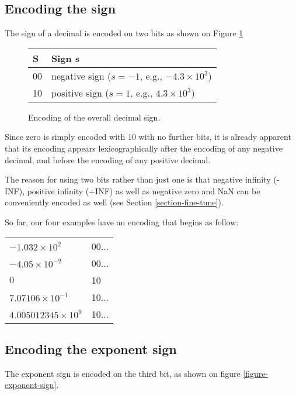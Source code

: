 \documentclass{acm_proc_article-sp}
\begin{document}
\subsection{Encoding the sign}

The sign of a decimal is encoded on two bits as shown on Figure \ref{figure-sign}

\begin{figure}[p]
\caption{Encoding of the overall decimal sign.}
\label{figure-sign}
\center
\begin{tabular}{|l|l|}
\hline
S & Sign s \\
\hline
00 &  negative sign ($s=-1$, e.g., $-4.3\times10^3$)\\
\hline
10 & positive sign ($s=1$, e.g., $4.3\times10^3$)\\
\hline
\end{tabular}
\end{figure}

Since zero is simply encoded with $10$ with no further bits, it is already apparent that its encoding appears lexicographically after the encoding of any negative decimal, and before the encoding of any positive decimal.

The reason for using two bits rather than just one is that negative infinity (-INF), positive infinity (+INF) as well as negative zero and NaN can be conveniently encoded as well (see Section \ref{section-fine-tune}).

So far, our four examples have an encoding that begins as follow:

\begin{tabular}{l|l}
$- 1.032 \times 10^2$ & 00... \\

$-4.05 \times 10^{-2}$ & 00... \\

$0$ & 10 \\

$7.07106 \times 10^{-1}$ & 10... \\

$4.005012345 \times 10^9$ & 10...\\
\end{tabular}
\subsection{Encoding the exponent sign}

The exponent sign is encoded on the third bit, as shown on figure \ref{figure-exponent-sign}.
\end{document}
